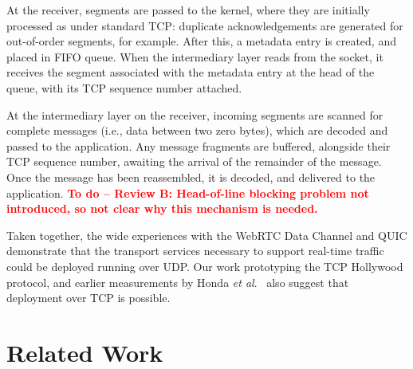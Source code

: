 \documentclass{sig-alternate-05-2015}
\newcommand{\todo}[1]{\textbf{\textcolor{red}{To do -- #1}}}
\begin{document}
At the receiver, segments are passed to the kernel, where they are
initially processed as under standard TCP: duplicate acknowledgements are
generated for out-of-order segments, for example. After this, a metadata
entry is created, and placed in FIFO queue. When the intermediary layer
reads from the socket, it receives the segment associated with the
metadata entry at the head of the queue, with its TCP sequence number
attached.

At the intermediary layer on the receiver, incoming segments are scanned
for complete messages (i.e., data between two zero bytes), which are
decoded and passed to the application. Any message fragments are buffered,
alongside their TCP sequence number, awaiting the arrival of the remainder
of the message. Once the message has been reassembled, it is decoded, and
delivered to the application.
\todo{Review B: Head-of-line blocking problem not introduced, so not clear
why this mechanism is needed.}

Taken together, the wide experiences with the WebRTC Data Channel and QUIC
demonstrate that the transport services necessary to support real-time
traffic could be deployed running over UDP. Our work prototyping the TCP
Hollywood protocol, and earlier measurements by Honda \emph{et al}.\
\cite{honda:2011:extend-tcp} also suggest that deployment over TCP is
possible.

\section{Related Work}
\label{sec:related}

%
%
\end{document}
